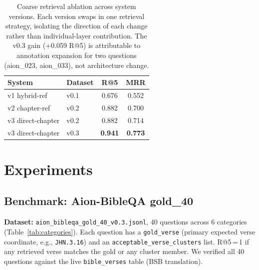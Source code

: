 \documentclass[11pt]{article}
\begin{document}
\begin{table}[t]
  \centering
  \small
  \begin{tabular}{llcc}
    \toprule
    \textbf{System} & \textbf{Dataset} & \textbf{R@5} & \textbf{MRR} \\
    \midrule
    v1 hybrid-ref     & v0.1 & 0.676 & 0.552 \\
    v2 chapter-ref    & v0.2 & 0.882 & 0.700 \\
    v3 direct-chapter & v0.2 & 0.882 & 0.714 \\
    v3 direct-chapter & v0.3 & \textbf{0.941} & \textbf{0.773} \\
    \bottomrule
  \end{tabular}
  \caption{Coarse retrieval ablation across system versions. Each version swaps in one retrieval strategy, isolating the direction of each change rather than individual-layer contribution. The v0.3 gain (+0.059 R@5) is attributable to annotation expansion for two questions (aion\_023, aion\_033), not architecture change.}
  \label{tab:versions}
\end{table}

\section{Experiments}

\subsection{Benchmark: Aion-BibleQA gold\_40}

\textbf{Dataset:} \texttt{aion\_bibleqa\_gold\_40\_v0.3.jsonl}, 40 questions across 6 categories (Table~\ref{tab:categories}).
Each question has a \texttt{gold\_verse} (primary expected verse coordinate, e.g., \texttt{JHN.3.16}) and an \texttt{acceptable\_verse\_clusters} list.
R@5\,=\,1 if any retrieved verse matches the gold or any cluster member.
We verified all 40 questions against the live \texttt{bible\_verses} table (BSB translation).
\end{document}

